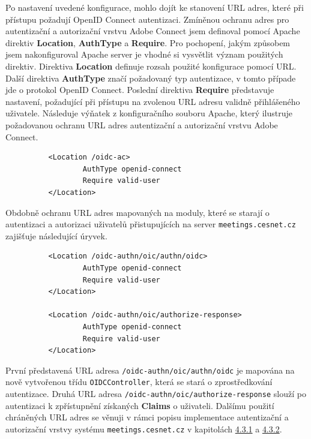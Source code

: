 \documentclass[
  printed, %
  twoside, %
  table,   %
  nolof,     %
  nolot,     %
]{fithesis3}
\begin{document}
Po nastavení uvedené konfigurace, mohlo dojít ke stanovení URL adres, které při přístupu požadují OpenID Connect autentizaci. Zmíněnou ochranu adres pro autentizační a autorizační vrstvu Adobe Connect jsem definoval pomocí Apache direktiv \textbf{Location}, \textbf{AuthType} a \textbf{Require}. Pro pochopení, jakým způsobem jsem nakonfiguroval Apache server je vhodné si vysvětlit význam použitých direktiv. Direktiva \textbf{Location} definuje rozsah použité konfigurace pomocí URL. Další direktiva \textbf{AuthType} značí požadovaný typ autentizace, v tomto případe jde o protokol OpenID Connect. Poslední direktiva \textbf{Require} představuje nastavení, požadující při přístupu na zvolenou URL adresu validně přihlášeného uživatele. Následuje výňatek z konfiguračního souboru Apache, který ilustruje požadovanou ochranu URL adres autentizační a autorizační vrstvu Adobe Connect.
\begin{lstlisting}
          <Location /oidc-ac>
                  AuthType openid-connect
                  Require valid-user
          </Location>
\end{lstlisting}
\label{ac-location}

Obdobně ochranu URL adres mapovaných na moduly, které se starají o autentizaci a autorizaci uživatelů přistupujících na server \texttt{meetings.cesnet.cz} zajišťuje následující úryvek. 

\begin{lstlisting}
          <Location /oidc-authn/oic/authn/oidc>
                  AuthType openid-connect
                  Require valid-user
          </Location>
          
          <Location /oidc-authn/oic/authorize-response>
                  AuthType openid-connect
                  Require valid-user
          </Location>
\end{lstlisting}
První představená URL adresa \texttt{/oidc-authn/oic/authn/oidc} je mapována na nově vytvořenou třídu \texttt{OIDCController}, která se stará o zprostředkování autentizace. Druhá URL adresa \texttt{/oidc-authn/oic/authorize-response} slouží po autentizaci k zpřístupnění získaných \textbf{Claims} o uživateli. Dalšímu použití  chráněných URL adres se věnuji v rámci popisu implementace autentizační a autorizační vrstvy systému \texttt{meetings.cesnet.cz} v kapitolách \hyperref[ShongoImpl-authn]{4.3.1} a \hyperref[ShongoImpl-authn]{4.3.2}.

\label{shongo-location}
\end{document}
